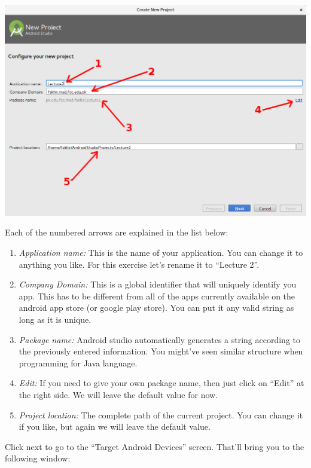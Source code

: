 \begin{center}
	\includegraphics[scale=0.3]{chapters/ch02/images/2_app_name}
\end{center}

Each of the numbered arrows are explained in the list below:

\begin{enumerate}
	\item \textit{Application name:} This is the name of your application. You can change it to anything you like. For this exercise let's rename it to ``Lecture 2''.
	\item \textit{Company Domain:} This is a global identifier that will uniquely identify you app. This has to be different from all of the apps currently available on the android app store (or google play store). You can put it any valid string as long as it is unique.
	\item \textit{Package name:} Android studio automatically generates a string according to the previously entered information. You might've seen similar structure when programming for Java language.
	\item \textit{Edit:} If you need to give your own package name, then just click on ``Edit'' at the right side. We will leave the default value for now.
	\item \textit{Project location:} The complete path of the current project. You can change it if you like, but again we will leave the default value.
\end{enumerate}

Click next to go to the ``Target Android Devices'' screen. That'll bring you to the following window:

